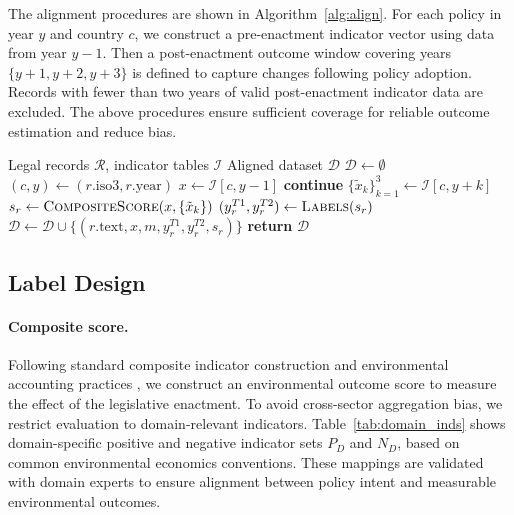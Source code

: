 \documentclass[11pt]{article}
\begin{document}
The alignment procedures are shown in Algorithm~\ref{alg:align}. For each policy in year $y$ and country $c$, we construct a pre-enactment indicator vector using data from year $y-1$. Then a post-enactment outcome window covering years $\{y+1, y+2, y+3\}$ is defined to capture changes following policy adoption. Records with fewer than two years of valid post-enactment indicator data are excluded. The above procedures ensure sufficient coverage for reliable outcome estimation and reduce bias.

\begin{algorithm}[t]
\small
\caption{Policy–Outcome Alignment}
\label{alg:align}
\begin{algorithmic}[1]
\Require Legal records $\mathcal{R}$, indicator tables $\mathcal{I}$
\Ensure Aligned dataset $\mathcal{D}$
\State $\mathcal{D}\gets\emptyset$
    \State $(c,y)\gets(r.\text{iso3}, r.\text{year})$
    \State $x\gets \mathcal{I}[c, y-1]$ 
    \State \textbf{continue}
    \EndIf
    \State $\{\tilde{x}_k\}_{k=1}^{3}\gets \mathcal{I}[c, y+k]$
    \State $s_r \gets \textsc{CompositeScore}(x, \{\tilde{x}_k\})$
    \State $(y^{T1}_r, y^{T2}_r)\gets\textsc{Labels}(s_r)$
    \State $\mathcal{D}\gets\mathcal{D}\cup\{(r.\text{text}, x, m, y^{T1}_r, y^{T2}_r, s_r)\}$
\EndFor
\State \textbf{return} $\mathcal{D}$
\end{algorithmic}
\end{algorithm}

\subsection{Label Design}
\label{sec:labels}

\paragraph{Composite score.}
Following standard composite indicator construction and environmental accounting practices \citep{joint2008handbook}, we construct an environmental outcome score to measure the effect of the legislative enactment. To avoid cross-sector aggregation bias, we restrict evaluation to domain-relevant indicators. Table~\ref{tab:domain_inds} shows domain-specific positive and negative indicator sets $P_D$ and $N_D$, based on common environmental economics conventions.  These mappings are validated with domain experts to ensure alignment between policy intent and measurable environmental outcomes.
\end{document}
